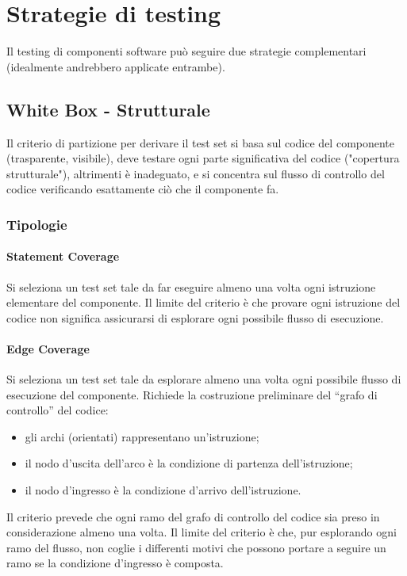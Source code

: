 \section{Strategie di testing}

Il testing di componenti software può seguire due strategie complementari (idealmente andrebbero applicate entrambe).

\subsection{White Box - Strutturale}

Il criterio di partizione per derivare il test set si basa sul codice del componente (trasparente, visibile), deve testare ogni parte significativa del codice ("copertura strutturale"), altrimenti è inadeguato, e si concentra sul flusso di controllo del codice verificando esattamente ciò che il componente fa.

\subsubsection{Tipologie}

\paragraph{Statement Coverage} Si seleziona un test set tale da far eseguire almeno una volta ogni istruzione elementare del componente. Il limite del criterio è che provare ogni istruzione del codice non significa assicurarsi di esplorare ogni possibile flusso di esecuzione.
   
\paragraph{Edge Coverage} Si seleziona un test set tale da esplorare almeno una volta ogni possibile flusso di esecuzione del componente. Richiede la costruzione preliminare del “grafo di controllo” del codice: 
\begin{itemize}
       \item gli archi (orientati) rappresentano un'istruzione; 
       \item il nodo d'uscita dell'arco è la condizione di partenza dell'istruzione;
       \item il nodo d'ingresso è la condizione d'arrivo dell'istruzione. 
\end{itemize}
Il criterio prevede che ogni ramo del grafo di controllo del codice sia preso in considerazione almeno una volta. Il limite del criterio è che, pur esplorando ogni ramo del flusso, non coglie i differenti motivi che possono portare a seguire un ramo se la condizione d'ingresso è composta.
   
